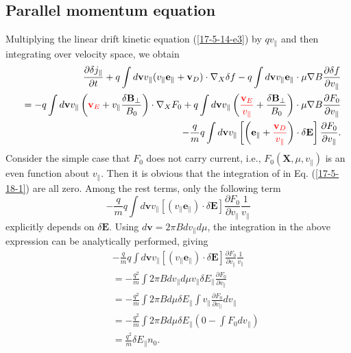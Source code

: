 \documentclass{llncs}
\newcommand{\tmcolor}[2]{{\color{#1}{#2}}}
\begin{document}
\subsection{Parallel momentum equation}

Multiplying the linear drift kinetic equation (\ref{17-5-14-e3}) by $q
v_{\parallel}$ and then integrating over velocity space, we obtain
\begin{eqnarray}
  &  & \frac{\partial \delta j_{\parallel}}{\partial t} + q \int
  d\mathbf{v}v_{\parallel} (v_{\parallel} \mathbf{e}_{\parallel}
  +\mathbf{v}_D) \cdot \nabla_X \delta f - q \int d\mathbf{v}v_{\parallel}
  \mathbf{e}_{\parallel} \cdot \mu \nabla B \frac{\partial \delta f}{\partial
  v_{\parallel}} \nonumber\\
  &  & = - q \int d\mathbf{v}v_{\parallel} \left( \tmcolor{red}{\mathbf{v}_E}
  + v_{\parallel} \frac{\delta \mathbf{B}_{\perp}}{B_0} \right) \cdot \nabla_X
  F_0 + q \int d\mathbf{v}v_{\parallel} \left(
  \tmcolor{red}{\frac{\mathbf{v}_E}{v_{\parallel}}} + \frac{\delta
  \mathbf{B}_{\perp}}{B_0} \right) \cdot \mu \nabla B \frac{\partial
  F_0}{\partial v_{\parallel}} \nonumber\\
  &  & - \frac{q}{m} q \int d\mathbf{v}v_{\parallel} \left[ \left(
  \mathbf{e}_{\parallel} + \tmcolor{red}{\frac{\mathbf{v}_D}{v_{\parallel}}}
  \right) \cdot \delta \mathbf{E} \right] \frac{\partial F_0}{\partial
  v_{\parallel}} .  \label{17-5-18-1}
\end{eqnarray}
Consider the simple case that $F_0$ does not carry current, i.e., $F_0
(\mathbf{X}, \mu, v_{\parallel})$ is an even function about $v_{\parallel}$.
Then it is obvious that the integration of \tmcolor{red}{the terms in red} in
Eq. (\ref{17-5-18-1}) are all zero. Among the rest terms, only the following
term
\begin{equation}
  \label{17-5-15-p3} - \frac{q}{m} q \int d\mathbf{v}v_{\parallel}
  [(v_{\parallel} \mathbf{e}_{\parallel}) \cdot \delta \mathbf{E}]
  \frac{\partial F_0}{\partial v_{\parallel}}  \frac{1}{v_{\parallel}}
\end{equation}
explicitly depends on $\delta \mathbf{E}$. Using $d\mathbf{v}= 2 \pi B d
v_{\parallel} d \mu$, the integration in the above expression can be
analytically performed, giving
\begin{eqnarray}
  &  & - \frac{q}{m} q \int d\mathbf{v}v_{\parallel} [(v_{\parallel}
  \mathbf{e}_{\parallel}) \cdot \delta \mathbf{E}] \frac{\partial
  F_0}{\partial v_{\parallel}}  \frac{1}{v_{\parallel}} \nonumber\\
  &  & = - \frac{q^2}{m} \int 2 \pi B d v_{\parallel} d \mu v_{\parallel}
  \delta E_{\parallel} \frac{\partial F_0}{\partial v_{\parallel}} 
  \nonumber\\
  &  & = - \frac{q^2}{m} \int 2 \pi B d \mu \delta E_{\parallel} \int
  v_{\parallel} \frac{\partial F_0}{\partial v_{\parallel}} d v_{\parallel}
  \nonumber\\
  &  & = - \frac{q^2}{m} \int 2 \pi B d \mu \delta E_{\parallel} \left( 0 -
  \int F_0 d v_{\parallel} \right) \nonumber\\
  &  & = \frac{q^2}{m} \delta E_{\parallel} n_0 . 
\end{eqnarray}
\end{document}
